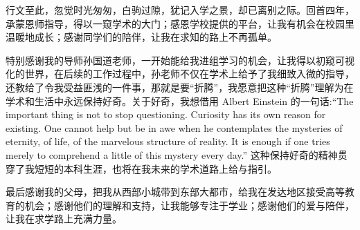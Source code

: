 行文至此，忽觉时光匆匆，白驹过隙，犹记入学之景，却已离别之际。回首四年，承蒙恩师指导，得以一窥学术的大门；感恩学校提供的平台，让我有机会在校园里温暖地成长；感谢同学们的陪伴，让我在求知的路上不再孤单。

特别感谢我的导师孙国道老师，一开始能给我进组学习的机会，让我得以初窥可视化的世界，在后续的工作过程中，孙老师不仅在学术上给予了我细致入微的指导，还教给了令我受益匪浅的一件事，那就是要“折腾”，我愿意把这种“折腾”理解为在学术和生活中永远保持好奇。关于好奇，我想借用 Albert Einstein 的一句话:``The important thing is not to stop questioning. Curiosity has its own reason for existing. One cannot help but be in awe when he contemplates the mysteries of eternity, of life, of the marvelous structure of reality. It is enough if one tries merely to comprehend a little of this mystery every day.'' 这种保持好奇的精神贯穿了我短短的本科生涯，也将在我未来的学术道路上给与指引。

最后感谢我的父母，把我从西部小城带到东部大都市，给我在发达地区接受高等教育的机会；感谢他们的理解和支持，让我能够专注于学业；感谢他们的爱与陪伴，让我在求学路上充满力量。